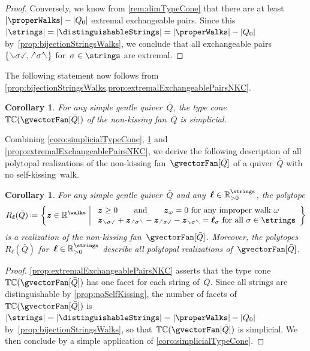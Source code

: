 \documentclass{amsart}
\newtheorem{corollary}[theorem]{Corollary}
\theoremstyle{definition}
\newcommand{\R}{\mathbb{R}} %
\renewcommand{\b}[1]{{\boldsymbol{#1}}} %
\newcommand{\set}[2]{\left\{ #1 \;\middle|\; #2 \right\}} %
\newcommand{\eqdef}{\mbox{\,\raisebox{0.2ex}{\scriptsize\ensuremath{\mathrm:}}\ensuremath{=}\,}} %
\newcommand{\typeCone}{\mathbb{TC}} %
\newcommand{\quiver}{\bar Q} %
\newcommand{\hL}{\text{\rotatebox[origin=c]{180}{\checked}}}
\newcommand{\hR}{\text{\rotatebox[origin=c]{180}{\reflectbox{\checked}}}}
\newcommand{\cL}{\text{\reflectbox{\checked}}}
\newcommand{\cR}{\text{\checked}}
\newcommand{\hh}[1]{\hL#1\hR} %
\newcommand{\cc}[1]{\cL#1\cR} %
\newcommand{\hc}[1]{\hL#1\cR} %
\newcommand{\ch}[1]{\cL#1\hR} %
\begin{document}
\begin{proof}
Conversely, we know from \cref{rem:dimTypeCone} that there are at least~$|\properWalks|-|Q_0|$ extremal exchangeable pairs. Since this~$|\strings| = |\distinguishableStrings| = |\properWalks| - |Q_0|$ by~\cref{prop:bijectionStringsWalks}, we conclude that all exchangeable pairs~$\{\cc{\sigma}, \hh{\sigma}\}$ for~$\sigma \in \strings$ are extremal.
\end{proof}

The following statement now follows from \cref{prop:bijectionStringsWalks,prop:extremalExchangeablePairsNKC}.

\begin{corollary}
\label{coro:simplicialTypeConeNKC}
For any simple gentle quiver~$\quiver$, the type cone~$\typeCone(\gvectorFan[\quiver])$ of the non-kissing fan~$\quiver$ is simplicial.
\end{corollary}

Combining \cref{coro:simplicialTypeCone}, \cref{coro:simplicialTypeConeNKC} and \cref{prop:extremalExchangeablePairsNKC}, we derive the following description of all polytopal realizations of the non-kissing fan~$\gvectorFan[\quiver]$ of a quiver~$\quiver$ with no self-kissing~walk.

\begin{corollary}
\label{coro:allPolytopalRealizationsNKC}
For any simple gentle quiver~$\quiver$ and any~$\b{\ell} \in \R_{>0}^{\strings}$, the polytope
\[
R_\b{\ell}(\quiver) \eqdef \set{\b{z} \in \R^{\walks}}{\begin{array}{l} \b{z} \ge 0 \qquad\text{and}\qquad \b{z}_\omega = 0 \text{ for any improper walk } \omega \\ \b{z}_{\cc{\sigma}} + \b{z}_{\hh{\sigma}} - \b{z}_{\hc{\sigma}} - \b{z}_{\ch{\sigma}} = \b{\ell}_\sigma \text{ for all } \sigma \in \strings\end{array}}
\]
is a realization of the non-kissing fan~$\gvectorFan[\quiver]$.
Moreover, the polytopes~$R_\b{\ell}(\quiver)$ for~$\b{\ell} \in \R_{>0}^{\strings}$ describe all polytopal realizations of~$\gvectorFan[\quiver]$.
\end{corollary}

\begin{proof}
\cref{prop:extremalExchangeablePairsNKC} asserts that the type cone~$\typeCone(\gvectorFan[\quiver])$ has one facet for each string of~$\quiver$.
Since all strings are distinguishable by \cref{prop:noSelfKissing}, the number of facets of~$\typeCone(\gvectorFan[\quiver])$ is $|\strings| = |\distinguishableStrings| = |\properWalks| - |Q_0|$ by~\cref{prop:bijectionStringsWalks}, so that~$\typeCone(\gvectorFan[\quiver])$ is simplicial. We then conclude by a simple application of \cref{coro:simplicialTypeCone}.
\end{proof}
\end{document}
